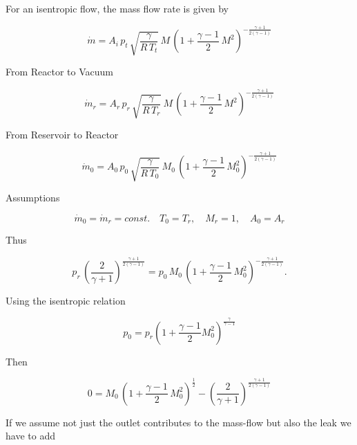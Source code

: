 For an isentropic flow, the mass flow rate is given by

$$
	\dot{m} = A_i\, p_t\, \sqrt{\frac{\gamma}{R\,T_t}}\, M\,\left(1+\frac{\gamma-1}{2}\,M^2\right)^{-\frac{\gamma+1}{2(\gamma-1)}}
$$

From Reactor to Vacuum

$$
	\dot{m}_r = A_r\, p_r\, \sqrt{\frac{\gamma}{R\,T_r}}\, M\,\left(1+\frac{\gamma-1}{2}\,M^2\right)^{-\frac{\gamma+1}{2(\gamma-1)}}
$$

From Reservoir to Reactor

$$
	\dot{m}_0 = A_0\, p_0\, \sqrt{\frac{\gamma}{R\,T_0}}\, M_0\,\left(1+\frac{\gamma-1}{2}\,M_0^2\right)^{-\frac{\gamma+1}{2(\gamma-1)}}
$$

Assumptions

$$
	\dot{m}_0 = \dot{m}_r = const.\quad T_0 = T_r,\quad M_r = 1, \quad A_0 = A_r
$$

Thus

$$
	p_r\, \left(\frac{2}{\gamma+1}\right)^{\frac{\gamma+1}{2(\gamma-1)}}
	= p_0\, M_0\,\left(1+\frac{\gamma-1}{2}\,M_0^2\right)^{-\frac{\gamma+1}{2(\gamma-1)}}.
$$

Using the isentropic relation

$$
	p_0 = p_r \left(1 + \frac{\gamma - 1}{2} M_0^2\right)^{\frac{\gamma}{\gamma - 1}}
$$

Then

$$
	0 = 
	M_0\,\left(1+\frac{\gamma-1}{2}\,M_0^2\right)^{\frac{1}{2}}
	- \left(\frac{2}{\gamma+1}\right)^{\frac{\gamma+1}{2(\gamma-1)}}
$$

If we assume not just the outlet contributes to the mass-flow but also the leak we have to add 

